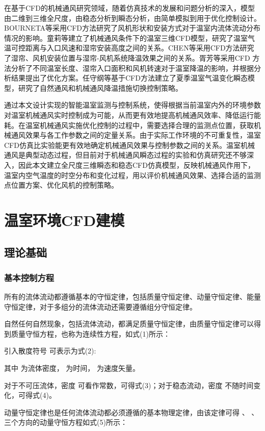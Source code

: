 在基于CFD的机械通风研究领域，随着仿真技术的发展和问题分析的深入，模型由二维到三维全尺度，由稳态分析到瞬态分析，由简单模拟到用于优化控制设计。BOURNETA等采用CFD方法研究了风机形状和安装方式对于温室内流体流动分布情况的影响。童莉等建立了机械通风条件下的温室三维CFD模型，研究了温室气温可控距离与入口风速和湿帘安装高度之间的关系。CHEN等采用CFD方法研究了湿帘、风机安装位置与湿帘-风机系统降温效果之间的关系。胥芳等采用CFD 方法分析了不同温室长度、湿帘入口面积和风机转速对于温室降温的影响，并根据分析结果提出了优化方案。任守纲等基于CFD方法建立了夏季温室气温变化瞬态模型，研究了自然通风和机械通风降温措施切换控制策略。

通过本文设计实现的智能温室监测与控制系统，使得根据当前温室内外的环境参数对温室机械通风实时控制成为可能，从而更有效地提高机械通风效率、降低运行能耗。在温室机械通风实施优化控制的过程中，需要选择合理的监测点位置，获取机械通风效果与各工作参数之间的定量关系。由于实际工作环境的不可重复性，温室CFD仿真比实验能更有效地确定机械通风效果与控制参数之间的关系。温室机械通风是典型动态过程，但目前对于机械通风瞬态过程的实验和仿真研究还不够深入，因此本文建立全尺度三维瞬态和稳态CFD仿真模型，反映机械通风作用下，温室内空气温度的时空分布和变化过程，用以评价机械通风效果、选择合适的监测点位置方案、优化风机的控制策略。


\section{温室环境CFD建模}
	\subsection{理论基础}
		\subsubsection{基本控制方程}
所有的流体流动都遵循基本的守恒定律，包括质量守恒定律、动量守恒定律、能量守恒定律，对于多组分的流体流动还需要遵循组分守恒定律。

自然任何自然现象，包括流体流动，都满足质量守恒定律，由质量守恒定律可以得到质量守恒方程，也称为连续性方程，如式(1)所示：

引入散度符号 可表示为式(2):

其中 为流体密度， 为时间， 为速度矢量。

对于不可压流体，密度 可看作常数，可得式(3)；对于稳态流动，密度 不随时间变化，可得式(4)。

动量守恒定律也是任何流体流动都必须遵循的基本物理定律，由该定律可得 、 、 三个方向的动量守恒方程如式(5)所示：

